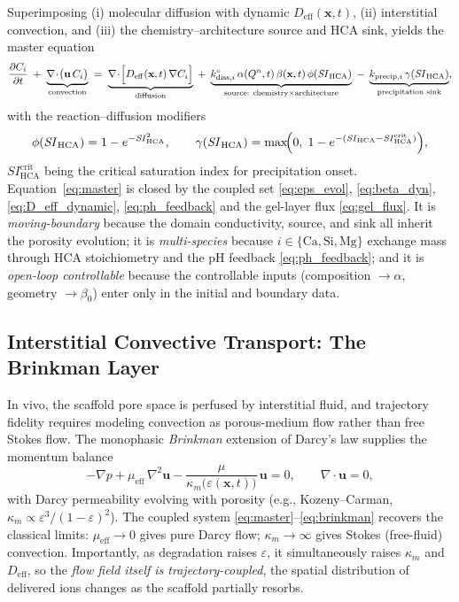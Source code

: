 \documentclass[11pt]{article}
\newcommand{\pde}[2]{\frac{\partial #1}{\partial #2}}
\newcommand{\SIhc}{\mathit{SI}_{\mathrm{HCA}}}
\newcommand{\Veff}{D_{\mathrm{eff}}}
\begin{document}
Superimposing (i) molecular diffusion with dynamic $\Veff(\mathbf{x},t)$, (ii) interstitial convection, and (iii) the chemistry--architecture source and HCA sink, yields the master equation
\begin{equation}
\pde{C_i}{t} \;+\; \underbrace{\nabla\!\cdot\!\bigl(\mathbf{u}\,C_i\bigr)}_{\text{convection}}
\;=\; \underbrace{\nabla\!\cdot\!\Bigl[\Veff(\mathbf{x},t)\,\nabla C_i\Bigr]}_{\text{diffusion}}
\;+\; \underbrace{k^{\circ}_{\mathrm{diss},i}\,\alpha(Q^n,t)\,\beta(\mathbf{x},t)\,\phi(\SIhc)}_{\text{source: chemistry}\times\text{architecture}}
\;-\; \underbrace{k_{\mathrm{precip},i}\,\gamma(\SIhc)}_{\text{precipitation sink}},
\label{eq:master}
\end{equation}
with the reaction--diffusion modifiers
\begin{equation}
\phi(\SIhc)=1-e^{-\SIhc^{2}},\qquad
\gamma(\SIhc)=\max\!\Bigl(0,\;1-e^{-(\SIhc-\SIhc^{\mathrm{crit}})}\Bigr),
\label{eq:phi_gamma}
\end{equation}
$\SIhc^{\mathrm{crit}}$ being the critical saturation index for precipitation onset. Equation~\eqref{eq:master} is closed by the coupled set \eqref{eq:eps_evol}, \eqref{eq:beta_dyn}, \eqref{eq:D_eff_dynamic}, \eqref{eq:ph_feedback} and the gel-layer flux \eqref{eq:gel_flux}. It is \emph{moving-boundary} because the domain conductivity, source, and sink all inherit the porosity evolution; it is \emph{multi-species} because $i\in\{\mathrm{Ca,Si,Mg}\}$ exchange mass through HCA stoichiometry and the pH feedback \eqref{eq:ph_feedback}; and it is \emph{open-loop controllable} because the controllable inputs (composition $\rightarrow\alpha$, geometry $\rightarrow\beta_0$) enter only in the initial and boundary data.


\subsection{Interstitial Convective Transport: The Brinkman Layer}


In vivo, the scaffold pore space is perfused by interstitial fluid, and trajectory fidelity requires modeling convection as porous-medium flow rather than free Stokes flow. The monophasic \emph{Brinkman} extension of Darcy's law \cite{Brinkman1947,Bear1972} supplies the momentum balance
\begin{equation}
-\nabla p + \mu_{\mathrm{eff}}\,\nabla^{2}\mathbf{u} - \frac{\mu}{\kappa_m\bigl(\varepsilon(\mathbf{x},t)\bigr)}\,\mathbf{u} = 0,\qquad
\nabla\!\cdot\!\mathbf{u}=0,
\label{eq:brinkman}
\end{equation}
with Darcy permeability evolving with porosity (e.g., Kozeny--Carman, $\kappa_m\propto\varepsilon^{3}/(1-\varepsilon)^{2}$). The coupled system \eqref{eq:master}--\eqref{eq:brinkman} recovers the classical limits: $\mu_{\mathrm{eff}}\!\to\!0$ gives pure Darcy flow; $\kappa_m\!\to\!\infty$ gives Stokes (free-fluid) convection. Importantly, as degradation raises $\varepsilon$, it simultaneously raises $\kappa_m$ and $\Veff$, so the \emph{flow field itself is trajectory-coupled}, the spatial distribution of delivered ions changes as the scaffold partially resorbs.
\end{document}
